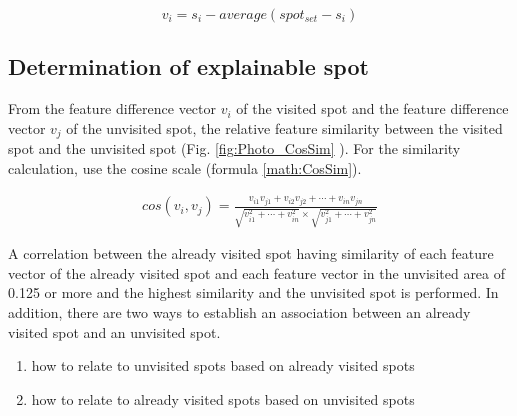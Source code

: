 \documentclass[journal]{IAENGtran}
\begin{document}
\begin{equation}
  v_i=s_i-average(spot_{set}-s_i)
    \label{math:Vector difference}
\end{equation}


\subsection{Determination of explainable spot}
\label{subsec:Determination of explainable spot}

From the feature difference vector $v_i$ of the visited spot and the feature difference vector $v_j$ of the unvisited spot, the relative feature similarity between the visited spot and the unvisited spot (Fig. \ref{fig:Photo_CosSim} ).
For the similarity calculation, use the cosine scale (formula \ref{math:CosSim}).

\begin{eqnarray}
cos(v_i,v_j)=\frac{v_{i1}v_{j1}+v_{i2}v_{j2}+\cdots+v_{in}v_{jn}}
{\sqrt{v^2_{i1}+\cdots+v^2_{in}}\times\sqrt{v^2_{j1}+\cdots+v^2_{jn}}}
\label{math:CosSim}
\end{eqnarray}

A correlation between the already visited spot having similarity of each feature vector of the already visited spot and each feature vector in the unvisited area of 0.125 or more and the highest similarity and the unvisited spot is performed.
In addition, there are two ways to establish an association between an already visited spot and an unvisited spot.

\begin{enumerate}
  \item how to relate to unvisited spots based on already visited spots
  \item how to relate to already visited spots based on unvisited spots
\end{enumerate}
\end{document}
